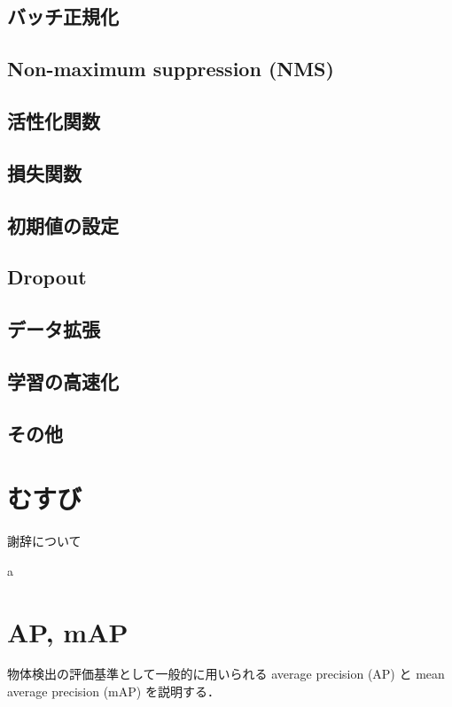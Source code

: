 \documentclass[originalpaper,fleqn]{jsaiart}     %
\begin{document}
\subsection{バッチ正規化}
\subsection{Non-maximum suppression (NMS)}
\subsection{活性化関数}
\subsection{損失関数}
\subsection{初期値の設定}
\subsection{Dropout}
\subsection{データ拡張}
\subsection{学習の高速化}
\subsection{その他}


\section{むすび}

\begin{acknowledgment}
謝辞について
\end{acknowledgment}a

%



\appendix

\section{AP, mAP}
物体検出の評価基準として一般的に用いられる average precision (AP) と mean average precision (mAP) を説明する．
\end{document}
